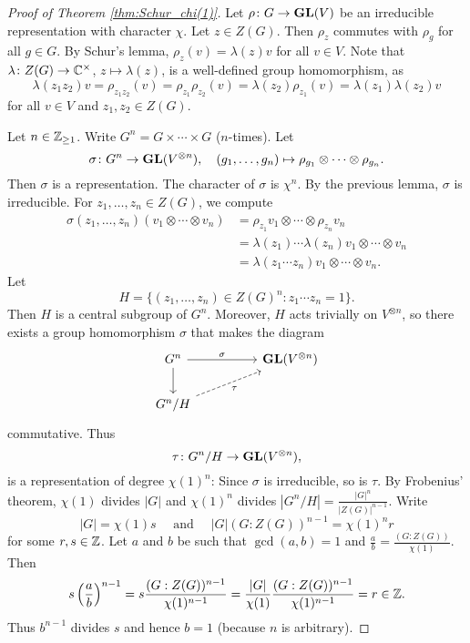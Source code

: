 \begin{proof}[Proof of Theorem \ref{thm:Schur_chi(1)}]
    Let $\rho\colon G\to\mathbf{GL}(V)$ be an irreducible representation 
    with character $\chi$. Let $z\in Z(G)$. Then $\rho_z$ commutes
    with $\rho_g$ for all $g\in G$. By Schur's lemma, 
    $\rho_z(v)=\lambda(z)v$ for all $v\in V$. Note that
    $\lambda\colon Z(G)\to\mathbb{C}^{\times}$, $z\mapsto\lambda(z)$, 
    is a well-defined group homomorphism, as 
    \[
    \lambda(z_1z_2)v=\rho_{z_1z_2}(v)=\rho_{z_1}\rho_{z_2}(v)
    =\lambda(z_2)\rho_{z_1}(v)=\lambda(z_1)\lambda(z_2)v
    \]
    for all $v\in V$ and $z_1,z_2\in Z(G)$. 
    
    Let $n\in\mathbb{Z}_{\geq1}$. Write $G^n=G\times\cdots\times G$ ($n$-times). Let
    \[
    \sigma\colon G^n\to\mathbf{GL}(V^{\otimes n}),\quad
    (g_1,\dots,g_n)\mapsto \rho_{g_1}\otimes\cdots\otimes\rho_{g_n}.
    \]
    Then $\sigma$ is a representation. 
    The character of $\sigma$ is $\chi^n$. By the previous lemma, 
    $\sigma$ is
    irreducible. For $z_1,\dots,z_n\in Z(G)$, we compute
    \begin{align*}   
    \sigma(z_1,\dots,z_n)(v_1\otimes\cdots\otimes v_n)&=\rho_{z_1}v_1\otimes\cdots\otimes \rho_{z_n}v_n\\
    &=\lambda(z_1)\cdots\lambda(z_n)v_1\otimes\cdots\otimes v_n\\
    &=\lambda(z_1\cdots z_n)v_1\otimes\cdots\otimes v_n.
    \end{align*}
    Let 
    \[
    H=\{(z_1,\dots,z_n)\in Z(G)^n:z_1\cdots z_n=1\}.
    \]  
    Then $H$ is a central subgroup of $G^n$. Moreover, 
    $H$ acts trivially on $V^{\otimes n}$, so there exists
    a group homomorphism $\sigma$ that makes the diagram 
    \[\begin{tikzcd}
	{G^n} && {\GL(V^{\otimes n})} \\
	{G^n/H}
	\arrow["\sigma", from=1-1, to=1-3]
	\arrow[from=1-1, to=2-1]
	\arrow["\tau"', dashed, from=2-1, to=1-3]
    \end{tikzcd}\]
    commutative. Thus  
    \[
    \tau\colon G^n/H\to\mathbf{GL}(V^{\otimes n}),
    \]
    is a representation 
    of degree $\chi(1)^n$:
    Since $\sigma$ is irreducible, so is $\tau$. 
    By Frobenius' theorem, $\chi(1)$ divides $|G|$ 
    and $\chi(1)^n$ divides $|G^n/H|=\frac{|G|^n}{|Z(G)|^{n-1}}$. 
    Write 
    \[
    |G|=\chi(1)s\quad\text{ and }\quad 
    |G|(G:Z(G))^{n-1}=\chi(1)^nr
    \]
    for some $r,s\in\mathbb{Z}$. Let $a$ and $b$ be such that 
    $\gcd(a,b)=1$ and 
    $\frac{a}{b}=\frac{(G:Z(G))}{\chi(1)}$. Then
    \[
    s\left(\frac{a}{b}\right)^{n-1}=s\frac{(G:Z(G))^{n-1}}{\chi(1)^{n-1}}
    =\frac{|G|}{\chi(1)}\frac{(G:Z(G))^{n-1}}{\chi(1)^{n-1}}=r\in\mathbb{Z}.
    \]
    Thus $b^{n-1}$ divides $s$ and hence $b=1$ (because $n$ is arbitrary).  
\end{proof}

